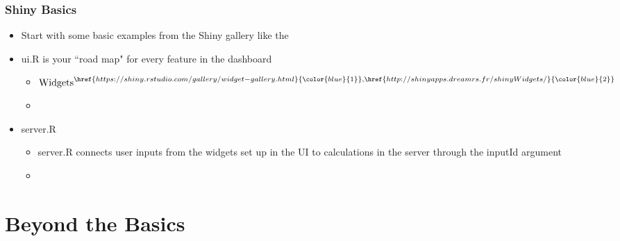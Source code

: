 \documentclass[
	11pt, %
]{beamer}
\begin{document}
\begin{frame}
	\frametitle{Shiny Basics}
	
	\begin{itemize}
		\item Start with some basic examples from the Shiny gallery like the \href{https://shiny.rstudio.com/gallery/telephones-by-region.html}{\color{blue}{telephones by region dashboard}}
		\item ui.R is your ``road map" for every feature in the dashboard
		\begin{itemize}
			\item $\textnormal{Widgets}^{\href{https://shiny.rstudio.com/gallery/widget-gallery.html}{\color{blue}{1}}, \href{http://shinyapps.dreamrs.fr/shinyWidgets/}{\color{blue}{2}}}$
			\item \href{https://shiny.rstudio.com/articles/progress.html}{\color{blue}{Progress bars}}
		\end{itemize}
		\item server.R
		\begin{itemize}
\item server.R connects user inputs from the widgets set up in the UI to calculations in the server through the inputId argument
\item \href{https://shiny.rstudio.com/articles/caching.html}{\color{blue}{Caching}}
		\end{itemize}
	\end{itemize}
	
	
\end{frame}



\section{Beyond the Basics}
\end{document}
